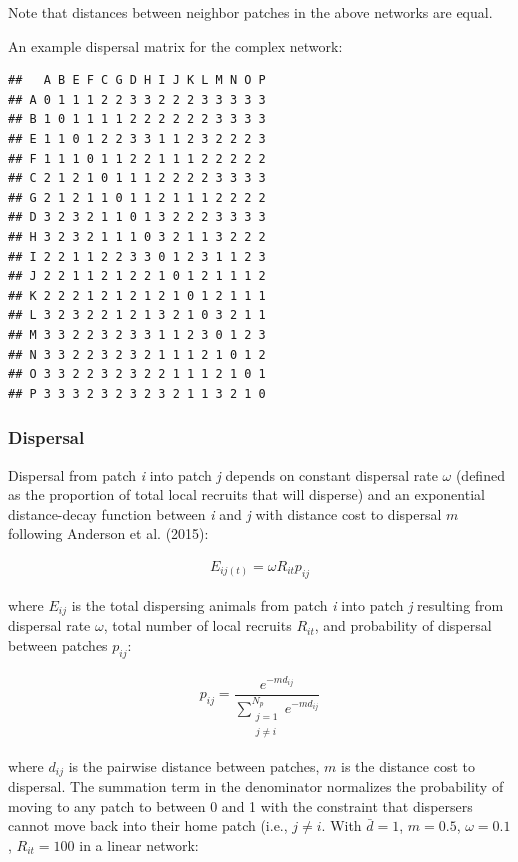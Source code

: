 \documentclass[
]{article}
\begin{document}
Note that distances between neighbor patches in the above networks are
equal.

\newpage

An example dispersal matrix for the complex network:

\begin{verbatim}
##   A B E F C G D H I J K L M N O P
## A 0 1 1 1 2 2 3 3 2 2 2 3 3 3 3 3
## B 1 0 1 1 1 1 2 2 2 2 2 2 3 3 3 3
## E 1 1 0 1 2 2 3 3 1 1 2 3 2 2 2 3
## F 1 1 1 0 1 1 2 2 1 1 1 2 2 2 2 2
## C 2 1 2 1 0 1 1 1 2 2 2 2 3 3 3 3
## G 2 1 2 1 1 0 1 1 2 1 1 1 2 2 2 2
## D 3 2 3 2 1 1 0 1 3 2 2 2 3 3 3 3
## H 3 2 3 2 1 1 1 0 3 2 1 1 3 2 2 2
## I 2 2 1 1 2 2 3 3 0 1 2 3 1 1 2 3
## J 2 2 1 1 2 1 2 2 1 0 1 2 1 1 1 2
## K 2 2 2 1 2 1 2 1 2 1 0 1 2 1 1 1
## L 3 2 3 2 2 1 2 1 3 2 1 0 3 2 1 1
## M 3 3 2 2 3 2 3 3 1 1 2 3 0 1 2 3
## N 3 3 2 2 3 2 3 2 1 1 1 2 1 0 1 2
## O 3 3 2 2 3 2 3 2 2 1 1 1 2 1 0 1
## P 3 3 3 2 3 2 3 2 3 2 1 1 3 2 1 0
\end{verbatim}

\hypertarget{dispersal}{%
\subsubsection{Dispersal}\label{dispersal}}

Dispersal from patch \emph{i} into patch \emph{j} depends on constant
dispersal rate \(\omega\) (defined as the proportion of total local
recruits that will disperse) and an exponential distance-decay function
between \emph{i} and \emph{j} with distance cost to dispersal \(m\)
following Anderson et al. (2015):

\begin{align}
E_{ij(t)}=\omega R_{it}p_{ij}
\end{align}

where \(E_{ij}\) is the total dispersing animals from patch \emph{i}
into patch \emph{j} resulting from dispersal rate \(\omega\), total
number of local recruits \(R_{it}\), and probability of dispersal
between patches \(p_{ij}\):

\begin{align}
p_{ij}=\dfrac{e^{-md_{ij}}}{\sum\limits_{\substack{j=1 \\ j\neq i}}^{N_p} e^{-md_{ij}}}
\end{align}

where \(d_{ij}\) is the pairwise distance between patches, \(m\) is the
distance cost to dispersal. The summation term in the denominator
normalizes the probability of moving to any patch to between 0 and 1
with the constraint that dispersers cannot move back into their home
patch (i.e., \(j\neq i\). With \(\bar{d}= 1\), \(m=0.5\),
\(\omega=0.1\), \(R_{it}=100\) in a linear network:
\end{document}
